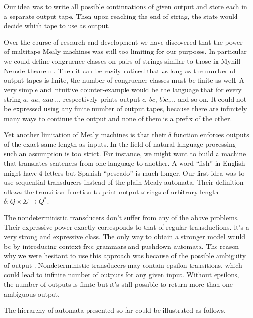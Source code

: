 Our idea was to write all possible continuations of given output and store each in a separate output tape. Then upon reaching the end of string, the state would decide which tape to use as output. 

Over the course of research and development we have discovered that the power of multitape Mealy machines was still too limiting for our purposes. In particular we could define congruence classes on pairs of strings similar to those in Myhill-Nerode theorem \cite{sipser}. Then it can be easily noticed that as long as the number of output tapes is finite, the number of congruence classes must be finite as well. A very simple and intuitive counter-example would be the language that for every string $a$, $aa$, $aaa$,... respectively prints output $c$, $bc$, $bbc$,... and so on. It could not be expressed using any finite number of output tapes, because there are infinitely many ways to continue the output and none of them is a prefix of the other.  



Yet another limitation of Mealy machines is that their $\delta$ function enforces outputs of the exact same length as inputs. In the field of natural language processing such an assumption is too strict. For instance, we might want to 
build a machine that translates sentences from one language to another. A word ``fish'' in English might have 4 letters but Spanish ``pescado'' is much longer. Our first idea was to use sequential transducers instead of the plain Mealy automata. Their definition allows the transition function to print output strings of arbitrary length $\delta:Q\times \Sigma \rightarrow Q^*$.  


The nondeterministic transducers \cite{MOHRI} \cite{MOHRI2} \cite{MOHRI3}  don't suffer from any of the above problems. Their expressive power exactly corresponds to that of regular transductions. It's a very strong and expressive class. The only way to obtain a stronger model would be by introducing context-free grammars and pushdown automata. The reason why we were hesitant to use this approach was because of the possible ambiguity of output \cite{Marie-Pierre}. Nondeterministic transducers may contain epsilon transitions, which could lead to infinite number of outputs \cite{MendozaDrosik2020MultitapeAA} for any given input. Without epsilons, the number of outputs is finite but it's still possible to return more than one ambiguous output. 


The hierarchy of automata presented so far could be illustrated as follows.
\begin{center}
\end{center}




